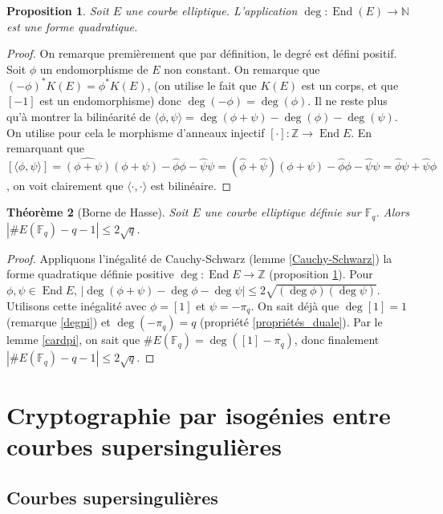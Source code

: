 \documentclass{article}
\theoremstyle{plain}%
\newtheorem{thm}{Théorème}[section]
\newtheorem{prop}[thm]{Proposition}
\theoremstyle{definition}%
\newcommand{\F}{\mathbb{F}}
\newcommand{\Z}{\mathbb{Z}}
\newcommand{\h}{\widehat}
\DeclareMathOperator{\End}{End}
\begin{document}
\begin{prop}
  \label{degré_quadratique}
  Soit $E$ une courbe elliptique. L'application $\deg : \End(E) \to \mathbb N$ est une forme quadratique.
\end{prop}

\begin{proof}
  On remarque premièrement que par définition, le degré est défini positif. Soit $\phi$ un endomorphisme de $E$ non constant. On remarque que $(-\phi)^*K(E) = \phi^*K(E)$, (on utilise le fait que $K(E)$ est un corps, et que $[-1]$ est un endomorphisme) donc $\deg(-\phi) = \deg(\phi)$. Il ne reste plus qu'à montrer la bilinéarité de $\langle \phi, \psi\rangle = \deg(\phi+\psi) - \deg(\phi) -\deg(\psi)$. On utilise pour cela le morphisme d'anneaux injectif $[\cdot] :\Z\to \End E$. En remarquant que $[\langle \phi, \psi\rangle] = \h{(\phi + \psi)}(\phi + \psi) - \h\phi\phi -\h\psi\psi =  (\h\phi + \h\psi)(\phi + \psi) - \h\phi\phi -\h\psi\psi = \h\phi\psi + \h\psi\phi$, on voit clairement que $\langle\cdot,\cdot\rangle$ est bilinéaire.
\end{proof}

\begin{thm}[Borne de Hasse]
  \label{hasse}
  Soit $E$ une courbe elliptique définie sur $\F_q$. Alors $|\#E(\F_q) - q -1|\le 2\sqrt{q}$.
\end{thm}

\begin{proof}
  Appliquons l'inégalité de Cauchy-Schwarz (lemme \ref{Cauchy-Schwarz})  la forme quadratique définie positive $\deg : \End E \to \Z$ (proposition \ref{degré_quadratique}). Pour $\phi, \psi\in \End E$, $|\deg(\phi+\psi) - \deg\phi -\deg\psi| \le 2\sqrt{(\deg\phi)(\deg\psi)}$. Utilisons cette inégalité avec $\phi = [1]$ et $\psi = -\pi_q$. On sait déjà que $\deg[1] = 1$ (remarque \ref{degpi}) et $\deg(-\pi_q) = q$ (propriété \ref{propriétés_duale}). 
  Par le lemme \ref{cardpi}, on sait que $\#E(\F_q) = \deg([1] - \pi_q)$, donc finalement $|\#E(\F_q)-q-1| \le 2\sqrt{q}$.
\end{proof}

\section{Cryptographie par isogénies entre courbes supersingulières}



\subsection{Courbes supersingulières}
\end{document}
